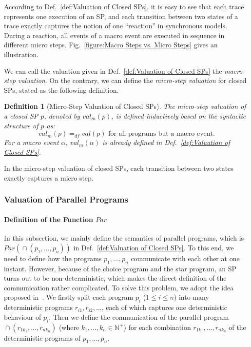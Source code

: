 \documentclass{fcs}
\newtheorem{mydef}{Definition}[section]
\newcommand{\mbb}[1]{\mathbb{#1}}
\newcommand{\val}[0]{\mathit{val}}
\newcommand{\Par}[0]{\mathit{Par}}
\DeclareMathOperator{\para}{\cap}
\newcommand{\mval}[0]{\mathit{val}_m}
\newcommand{\dddef}[0]{=_{df}}
\begin{document}
According to Def.~\ref{def:Valuation of Closed SPs}, it is easy to see that each trace represents one execution of an SP, and each transition between two states of a trace exactly captures the notion of one ``reaction'' in synchronous models.
During a reaction, all events of a macro event are executed in sequence in different micro steps.
Fig.~\ref{figure:Macro Steps vs. Micro Steps} gives an illustration.

We can call the valuation given in Def.~\ref{def:Valuation of Closed SPs} the \emph{macro-step valuation}.
\ifx
On the contrary, we can define the \emph{micro-step valuation} for closed SPs, stated as the following definition.

\begin{mydef}[Micro-Step Valuation of Closed SPs]
    The micro-step valuation of a closed SP $p$, denoted by $\mval(p)$, is defined inductively based on the syntactic structure of $p$ as:
        $$\mbox{$\mval(p)\dddef \val(p)$ for all programs but a macro event}.$$
    For a macro event $\alpha$, $\mval(\alpha)$ is already defined in Def.~\ref{def:Valuation of Closed SPs}.
\end{mydef}

In the micro-step valuation of closed SPs, each transition between two states exactly captures a micro step.
\fi


\subsubsection{Valuation of Parallel Programs}
\label{section:Valuation of Parallel Programs}

\paragraph{Definition of the Function $\Par$}
In this subsection, we mainly define the semantics of parallel programs, which is $\Par(\para(p_1,...,p_n))$ in Def.~\ref{def:Valuation of Closed SPs}.
To this end, we need to define how the programs $p_1,...,p_n$ communicate with each other at one instant.
However, because of the choice program and the star program, an SP turns out to be non-deterministic, which makes the direct definition of the communication rather complicated.
To solve this problem, we adopt the idea proposed  in~\cite{Peleg87}.
We firstly split each program $p_i$ ($1\le i\le n$) into many deterministic programs $r_{i1}, r_{i2}, ...$, each of which captures one deterministic behaviour of $p_i$.
Then we define the communication of the parallel program $\para(r_{1k_1},...,r_{nk_n})$ (where $k_1,...,k_n\in \mbb{N}^+$) for each combination $r_{1k_1},...,r_{nk_n}$ of the deterministic programs of $p_1,..., p_n$.
\end{document}
